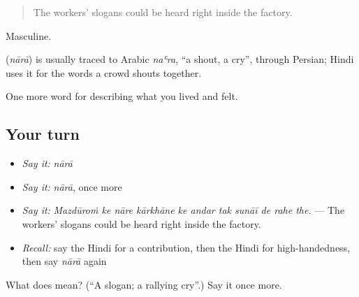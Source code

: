 \begin{quote}
The workers' slogans could be heard right inside the factory.
\end{quote}

Masculine.

\begin{cousinweb}
\textbf{} (\emph{nārā}) is usually traced to Arabic \emph{naʿra}, \textquotedblleft{}a shout, a cry\textquotedblright{}, through Persian; Hindi uses it for the words a crowd shouts together.
\end{cousinweb}

\begin{grammarlens}[title={What you've built}]
One more word for describing what you lived and felt.
\end{grammarlens}

\subsection*{Your turn}
\begin{itemize}
\raggedright
  \item \emph{Say it:} \emph{nārā}
  \item \emph{Say it:} \emph{nārā}, once more
  \item \emph{Say it:} \emph{Mazdūroṁ ke nāre kārkhāne ke andar tak sunāī de rahe the.} — The workers' slogans could be heard right inside the factory.
  \item \emph{Recall:} say the Hindi for a contribution, then the Hindi for high-handedness, then say \emph{nārā} again
\end{itemize}

\begin{tcolorbox}[breakable,colback=teal!4,colframe=teal!35!black,title={Before you move on}]
What does  mean? (\textquotedblleft{}A slogan; a rallying cry\textquotedblright{}.) Say it once more.
\end{tcolorbox}
